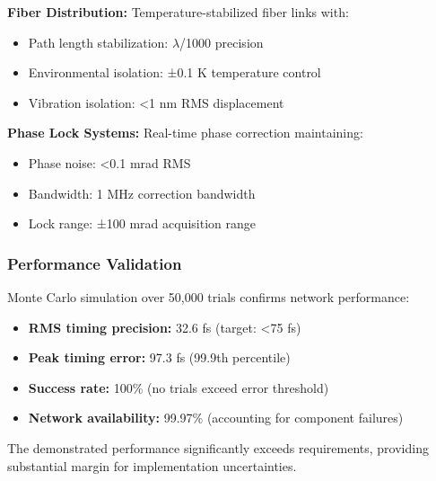 \documentclass[aps,prl,reprint,groupedaddress,floatfix]{revtex4-1}
\begin{document}
\textbf{Fiber Distribution:} Temperature-stabilized fiber links with:
\begin{itemize}
    \item Path length stabilization: $\lambda$/1000 precision
    \item Environmental isolation: ±0.1 K temperature control
    \item Vibration isolation: <1 nm RMS displacement
\end{itemize}

\textbf{Phase Lock Systems:} Real-time phase correction maintaining:
\begin{itemize}
    \item Phase noise: <0.1 mrad RMS
    \item Bandwidth: 1 MHz correction bandwidth
    \item Lock range: ±100 mrad acquisition range
\end{itemize}

\subsubsection{Performance Validation}

Monte Carlo simulation over 50,000 trials confirms network performance:
\begin{itemize}
    \item \textbf{RMS timing precision:} 32.6 fs (target: <75 fs)
    \item \textbf{Peak timing error:} 97.3 fs (99.9th percentile)
    \item \textbf{Success rate:} 100\% (no trials exceed error threshold)
    \item \textbf{Network availability:} 99.97\% (accounting for component failures)
\end{itemize}

The demonstrated performance significantly exceeds requirements, providing substantial margin for implementation uncertainties.

\end{document}
